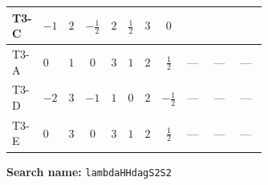 \documentclass[8pt]{article}
\begin{document}
\begin{landscape}
\begin{longtable}{@{}llcccccc >{\raggedright\arraybackslash}p{0.21\linewidth} >{\raggedright\arraybackslash}p{0.21\linewidth} >{\raggedright\arraybackslash}p{0.21\linewidth}@{}}
\midrule
T3-C & $-1$ & $2$ & $-\frac{1}{2}$ & $2$ & $\frac{1}{2}$ & $3$ & $0$ & \scriptsize\adjustbox{max width=\linewidth}{$\begin{gathered} {\lambda_{H^\dagger H^\dagger S_2 S_2}} (6 \operatorname{Tr}\!\left({Y_d}\,\left({Y_d}\right)^{\dagger}\right)+2 \operatorname{Tr}\!\left({Y_e}\,\left({Y_e}\right)^{\dagger}\right)+6 \operatorname{Tr}\!\left({Y_u}\,\left({Y_u}\right)^{\dagger}\right))\end{gathered}$} & \scriptsize\adjustbox{max width=\linewidth}{$\begin{gathered} +4 {\lambda_{H^\dagger H^\dagger S_1^\dagger S_1^\dagger}} \left({\lambda_{S_1^{\dagger 2}S_2^{\dagger 2}}}\right)^{*}\end{gathered}$} & \scriptsize\adjustbox{max width=\linewidth}{$\begin{gathered} +2 \left({\lambda_{T3}}\right)^{*} (\left({\lambda_{S_1^\dagger S_2 S_2^{\dagger 2}}}\right)^{*}-\left({\lambda_{H H^\dagger S_1^\dagger S_2^\dagger}^{\rm Cross}}\right)^{*})\end{gathered}$} \\
\midrule
T3-A & $0$ & $1$ & $0$ & $3$ & $1$ & $2$ & $\frac{1}{2}$ & --- & --- & --- \\
\midrule
T3-D & $-2$ & $3$ & $-1$ & $1$ & $0$ & $2$ & $-\frac{1}{2}$ & --- & --- & --- \\
\midrule
T3-E & $0$ & $3$ & $0$ & $3$ & $1$ & $2$ & $\frac{1}{2}$ & --- & --- & --- \\
\midrule
\bottomrule
\end{longtable}
\clearpage
\noindent\textbf{Search name: }\texttt{lambdaHHdagS2S2}\par\smallskip

\end{landscape}
\end{document}
